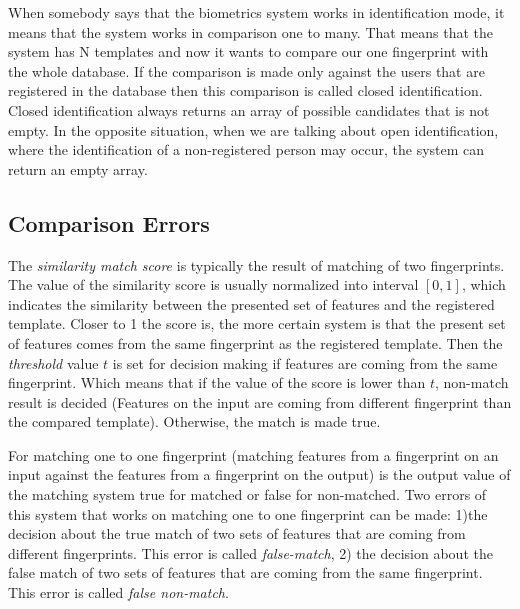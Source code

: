 When somebody says that the biometrics system works in identification mode, it means that the system works in comparison one to many. That means that the system has N templates and now it wants to compare our one fingerprint with the whole database. If the comparison is made only against the users that are registered in the database then this comparison is called closed identification. Closed identification always returns an array of possible candidates that is not empty. In the opposite situation, when we are talking about open identification, where the identification of a non-registered person may occur, the system can return an empty array. \cite{maltoni2009handbook}

\subsection{Comparison Errors}
The \emph{similarity match score} is typically the result of matching of two fingerprints. The value of the similarity score is usually normalized into interval $[0,1]$, which indicates the similarity between the presented set of features and the registered template. Closer to 1 the score is, the more certain system is that the present set of features comes from the same fingerprint as the registered template. Then the \emph{threshold} value $t$ is set for decision making if features are coming from the same fingerprint. Which means that if the value of the score is lower than $t$, non-match result is decided (Features on the input are coming from different fingerprint than the compared template). Otherwise, the match is made true. \cite{schuckers2010computational}

For matching one to one fingerprint (matching features from a fingerprint on an input against the features from a fingerprint on the output) is the output value of the matching system true for matched or false for non-matched. Two errors of this system that works on matching one to one fingerprint can be made: 1)the decision about the true match of two sets of features that are coming from different fingerprints. This error is called \emph{false-match}, 2) the decision about the false match of two sets of features that are coming from the same fingerprint. This error is called  \emph{false non-match}. \cite{schuckers2010computational} \cite{maltoni2009handbook}


